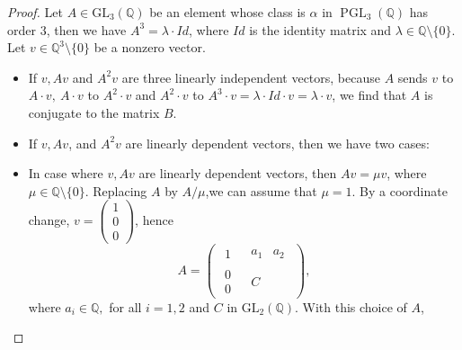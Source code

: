 \documentclass[10pt,a4paper]{amsart}
\DeclareMathOperator{\PGL}{PGL}
\newcommand{\Q}{\ensuremath{\mathbb{Q} }}
\begin{document}
\begin{proof}
    Let $A\in\mathrm{GL}_3(\Q )$ be an element whose class is $\alpha$ in $\PGL _3(\Q )$ has order $3$, then we have $A^3=\lambda\cdot Id$, where $Id$ is the identity matrix and $\lambda\in\Q \setminus\{0\}$. Let $v\in\Q ^3\setminus\{0\}$ be a nonzero vector.
  \begin{itemize}
        \item [(a)] If $v, Av$ and $A^2v$ are three linearly independent vectors, because $A$ sends $v$ to $A\cdot v,~A\cdot v$ to $A^2\cdot v$ and $A^2\cdot v$ to $A^3\cdot v=\lambda \cdot Id\cdot v=\lambda \cdot v$, we find that $A$ is conjugate to the matrix $B$.
        \item [(b)] If $v, Av$, and $A^2v$ are linearly dependent vectors, then we have two cases:
\end{itemize}
        \begin{itemize}
            \item [(b.1)] In case where $v, Av$ are linearly dependent vectors, then $Av=\mu v$, where $\mu \in \Q \setminus\{0\}$. Replacing $A$ by $A/\mu$,we can assume that $\mu=1$. By a coordinate change, $v=\left(\begin{array}{c}
                 1\\
                 0\\0 
            \end{array}\right)$, hence
\[A=\left(
  \begin{array}{ccc}
\begin{matrix}
    1
\end{matrix}
&
\begin{matrix}
    a_{1} & a_{2}
\end{matrix}\\
\begin{matrix}
    0\\0
\end{matrix}&
\begin{matrix}
    C
\end{matrix}
\end{array}
\right),
\]
where $a_i\in\Q ,$ for all $i=1,2$ and $C$ in $\mathrm{GL}_2(\Q )$. With this choice of $A$,


\end{itemize}
\end{proof}
\end{document}
